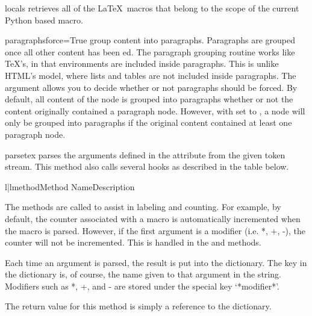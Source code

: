 \begin{methoddesc}[Macro]{locals}{}
retrieves all of the \LaTeX\ macros that belong to the scope of the
current Python based macro.
\end{methoddesc}

\begin{methoddesc}[Macro]{paragraphs}{force=True}
group content into paragraphs.  Paragraphs are grouped once all other
content has been ed.  The paragraph grouping routine works
like \TeX's, in that environments are included inside paragraphs.  This 
is unlike HTML's model, where lists and tables are not included inside 
paragraphs.  The  argument allows you to decide whether or not
paragraphs should be forced.  By default, all content of the node is 
grouped into paragraphs whether or not the content originally contained
a paragraph node.  However, with  set to , a node
will only be grouped into paragraphs if the original content contained
at least one paragraph node.
\end{methoddesc}

\begin{methoddesc}[Macro]{parse}{tex}
parses the arguments defined in the  attribute from the given
token stream.  This method also calls several hooks as described in the table
below.

\begin{tableii}{l|l}{method}{Method Name}{Description}
\end{tableii}

The methods are called to assist in labeling and counting.  For example,
by default, the counter associated with a macro is automatically incremented
when the macro is parsed.  However, if the first argument is a modifier 
(i.e. *, +, -), the counter will not be incremented.  This is handled 
in the  and  methods.

Each time an argument is parsed, the result is put into the 
dictionary.  The key in the dictionary is, of course, the name given to that
argument in the  string.  Modifiers such as *, +, and - are
stored under the special key `*modifier*'.

The return value for this method is simply a reference to the 
 dictionary.

\end{methoddesc}

